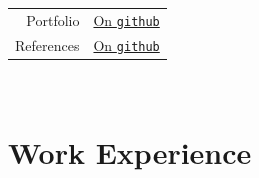\documentclass[a4paper,10pt,twoside]{article}
\begin{document}
\begin{tabular}{rp{10.5cm}}
  Portfolio & \href{https://mozilla.github.io/pdf.js/web/viewer.html?file=https://raw.githubusercontent.com/li9i/portfolio/master/portfolio.pdf}{On \texttt{github}} \\

  References & \href{https://docs.google.com/viewerng/viewer?url=https://raw.githubusercontent.com/li9i/cv/master/references/references_alexandros_filotheou.pdf}{On \texttt{github}}
\end{tabular}
\\

\vfill
\tableofcontents
\newpage

\vspace*{\fill}

\section{Work Experience}
\end{document}
